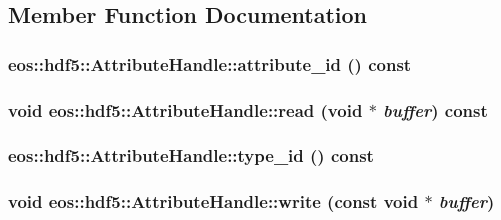 \subsection{Member Function Documentation}
\hypertarget{classeos_1_1hdf5_1_1AttributeHandle_a5412e79df3d179053902e0ac7b5a93ee}{
\subsubsection[{attribute\_\-id}]{ eos::hdf5::AttributeHandle::attribute\_\-id () const}}
\label{classeos_1_1hdf5_1_1AttributeHandle_a5412e79df3d179053902e0ac7b5a93ee}
\hypertarget{classeos_1_1hdf5_1_1AttributeHandle_a90da07975c70cfdbeab933e68d4ba76a}{
\subsubsection[{read}]{\setlength{\rightskip}{0pt plus 5cm}void eos::hdf5::AttributeHandle::read (void $\ast$ {\em buffer}) const}}
\label{classeos_1_1hdf5_1_1AttributeHandle_a90da07975c70cfdbeab933e68d4ba76a}
\hypertarget{classeos_1_1hdf5_1_1AttributeHandle_adc5a9f2119e7de59a83f782d9bae892b}{
\subsubsection[{type\_\-id}]{ eos::hdf5::AttributeHandle::type\_\-id () const}}
\label{classeos_1_1hdf5_1_1AttributeHandle_adc5a9f2119e7de59a83f782d9bae892b}
\hypertarget{classeos_1_1hdf5_1_1AttributeHandle_acb93f382e986654df68de9389f723efe}{
\subsubsection[{write}]{\setlength{\rightskip}{0pt plus 5cm}void eos::hdf5::AttributeHandle::write (const void $\ast$ {\em buffer})}}
\label{classeos_1_1hdf5_1_1AttributeHandle_acb93f382e986654df68de9389f723efe}


